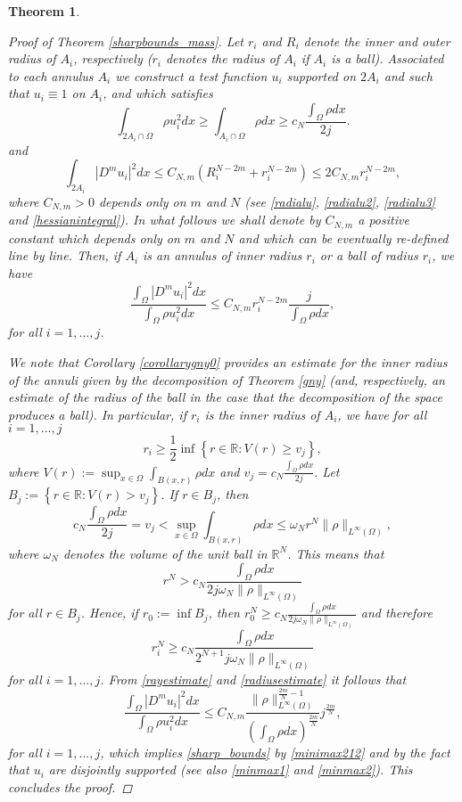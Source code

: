 \documentclass[11pt,a4paper]{amsart}
\numberwithin{equation}{section}
\newtheorem{thm}[equation]{Theorem}
\begin{document}
\begin{thm}
\begin{proof}[Proof of Theorem \ref{sharpbounds_mass}]
Let $r_i$ and $R_i$ denote the inner and outer radius of $A_i$, respectively ($r_i$ denotes the radius of $A_i$ if $A_i$ is a ball). Associated to each annulus $A_i$ we construct a test function $u_i$ supported on $2A_i$ and such that $u_i\equiv 1$ on $A_i$, and which satisfies
$$
\int_{2A_i\cap\Omega}\rho u_i^2 dx\geq\int_{A_i\cap\Omega}\rho dx\geq c_N\frac{\int_{\Omega}\rho dx}{2j}.
$$
and
$$
\int_{2A_i}|D^mu_i|^2dx\leq C_{N,m}(R_i^{N-2m}+r_i^{N-2m})\leq 2C_{N,m} r_i^{N-2m},
$$
where $C_{N,m}>0$ depends only on $m$ and $N$ (see \eqref{radialu}, \eqref{radialu2}, \eqref{radialu3} and \eqref{hessianintegral}). In what follows we shall denote by $C_{N,m}$ a positive constant which depends only on $m$ and $N$ and which can be eventually re-defined line by line. Then, if $A_i$ is an annulus of inner radius $r_i$ or a ball of radius $r_i$, we have
\begin{equation}\label{rayestimate}
\frac{\int_{\Omega}|D^m u_i|^2dx}{\int_{\Omega}\rho u_i^2dx}\leq C_{N,m} r_i^{N-2m}\frac{j}{\int_{\Omega}\rho dx},
\end{equation}
for all $i=1,...,j$.

We note that Corollary \ref{corollarygny0} provides an estimate for the inner radius of the annuli given by the decomposition of Theorem \ref{gny} (and, respectively, an estimate of the radius of the ball in the case that the decomposition of the space produces a ball). In particular, if $r_i$ is the inner radius of $A_i$, we have for all $i=1,...,j$ 
\begin{equation*}%
r_i\geq\frac{1}{2}\inf\left\{r\in\mathbb R:V(r)\geq v_j\right\},
\end{equation*}
where $V(r):=\sup_{x\in\Omega}\int_{B(x,r)}\rho dx$ and $v_j=c_N\frac{\int_{\Omega}\rho dx}{2 j}$. Let $B_j:=\left\{r\in\mathbb R:V(r)>v_j\right\}$. If $r\in B_j$, then 
$$
c_N\frac{\int_{\Omega}\rho dx}{2j}=v_j<\sup_{x\in\Omega}\int_{B(x,r)}\rho dx\leq\omega_N r^N\|\rho\|_{L^{\infty}(\Omega)},
$$
where $\omega_N$ denotes the volume of the unit ball in $\mathbb R^N$. This means that
$$
r^N> c_N\frac{\int_{\Omega}\rho dx}{2j\omega_N\|\rho\|_{L^{\infty}(\Omega)}}
$$
for all $r\in B_j$. Hence, if $r_0:=\inf B_j$, then $r_0^N\geq c_N\frac{\int_{\Omega}\rho dx}{2j\omega_N\|\rho\|_{L^{\infty}(\Omega)}}$ and therefore
\begin{equation}\label{radiusestimate}
r_i^N\geq c_N\frac{\int_{\Omega}\rho dx}{2^{N+1}j\omega_N\|\rho\|_{L^{\infty}(\Omega)}}
\end{equation}
for all $i=1,...,j$. From \eqref{rayestimate} and \eqref{radiusestimate} it follows that
$$
\frac{\int_{\Omega}|D^m u_i|^2dx}{\int_{\Omega}\rho u_i^2dx}\leq C_{N,m} \frac{\|\rho\|_{L^{\infty}(\Omega)}^{\frac{2m}{N}-1}}{\left(\int_{\Omega}\rho dx\right)^{\frac{2m}{N}}}j^{\frac{2m}{N}},
$$
for all $i=1,...,j$, which implies \eqref{sharp_bounds} by \eqref{minimax212} and by the fact that $u_i$ are disjointly supported (see also \eqref{minmax1} and \eqref{minmax2}). This concludes the proof.

\end{proof}
\end{thm}
\end{document}
